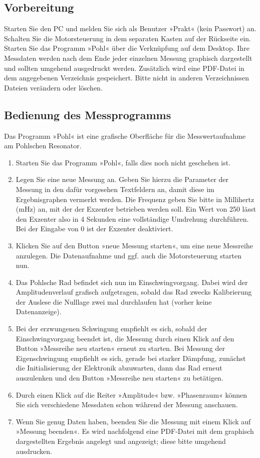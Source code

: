 \subsection{Vorbereitung}

Starten Sie den PC und melden Sie sich als Benutzer »Prakt« (kein Passwort) an. Schalten Sie die Motorsteuerung in dem separaten Kasten auf der Rückseite ein. Starten Sie das Programm »Pohl« über die Verknüpfung auf dem Desktop. Ihre Messdaten werden nach dem Ende jeder einzelnen Messung graphisch dargestellt und sollten umgehend ausgedruckt werden. Zusätzlich wird eine PDF-Datei in dem angegebenen Verzeichnis gespeichert. Bitte nicht in anderen Verzeichnissen Dateien verändern oder löschen.

\subsection{Bedienung des Messprogramms}

Das Programm »Pohl« ist eine grafische Oberfläche für die Messwertaufnahme am Pohlschen Resonator.
\begin{enumerate}
	\item Starten Sie das Programm »Pohl«, falls dies noch nicht geschehen ist.
	\item Legen Sie eine neue Messung an. Geben Sie hierzu die Parameter der Messung in den dafür vorgesehen Textfeldern an, damit diese im Ergebnisgraphen vermerkt werden. Die Frequenz geben Sie bitte in Millihertz (mHz) an, mit der der Exzenter betrieben werden soll. Ein Wert von 250 lässt den Exzenter also in 4 Sekunden eine vollständige Umdrehung durchführen. Bei der Eingabe von 0 ist der Exzenter deaktiviert.
	\item Klicken Sie auf den Button »neue Messung starten«, um eine neue Messreihe anzulegen. Die Datenaufnahme und ggf. auch die Motorsteuerung starten nun.
	\item Das Pohlsche Rad befindet sich nun im Einschwingvorgang. Dabei wird der Amplitudenverlauf grafisch aufgetragen, sobald das Rad zwecks Kalibrierung der Auslese die Nulllage zwei mal durchlaufen hat (vorher keine Datenanzeige). 
	\item Bei der erzwungenen Schwingung empfiehlt es sich, sobald der Einschwingvorgang beendet ist, die Messung durch einen Klick auf den Button »Messreihe neu starten« erneut zu starten. Bei Messung der Eigenschwingung empfiehlt es sich, gerade bei starker Dämpfung, zunächst die Initialisierung der Elektronik abzuwarten, dann das Rad erneut auszulenken und den Button »Messreihe neu starten« zu betätigen.
	\item Durch einen Klick auf die Reiter »Amplitude« bzw. »Phasenraum« können Sie sich verschiedene Messdaten schon während der Messung anschauen.
	\item Wenn Sie genug Daten haben, beenden Sie die Messung mit einem Klick auf »Messung beenden«. Es wird nachfolgend eine PDF-Datei mit dem graphisch dargestellten Ergebnis angelegt und angezeigt; diese bitte umgehend ausdrucken.
\end{enumerate}

